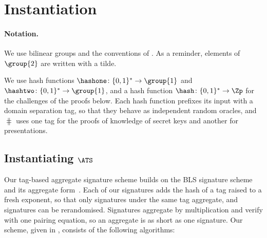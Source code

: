 \section{Instantiation}\label{sec:agg-creds-instantiation}

\paragraph{Notation.} We use bilinear groups and the conventions of
. As a reminder, elements of $\group{2}$ are written with a tilde.

We use hash functions $\hashone \colon \{0,1\}^* \rightarrow \group{1}$ and
$\hashtwo \colon \{0,1\}^* \rightarrow \group{1}$, and a hash function $\hash
\colon \{0,1\}^* \rightarrow \Zp$ for the challenges of the proofs below.
Each hash function prefixes its input with a domain separation tag, so that they
behave as independent random oracles, and $\hash$ uses one tag for the proofs of
knowledge of secret keys and another for presentations.

\subsection{Instantiating $\ATS$}\label{sec:agg-creds-tag-scheme}

Our tag-based aggregate signature scheme builds on the BLS signature scheme and
its aggregate form~\cite{JC:BonLynSha04,EC:BGLS03}. Each of our signatures adds
the hash of a tag raised to a fresh exponent, so that only signatures under the
same tag aggregate, and signatures can be rerandomised. Signatures aggregate by
multiplication and verify with one pairing equation, so an aggregate is as short
as one signature. Our scheme, given in , consists of the following algorithms:

